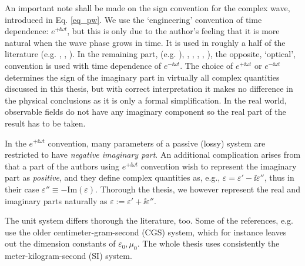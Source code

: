 An important note shall be made on the sign convention for the complex wave, introduced in Eq. \ref{eq_pw}.
We use the `engineering' convention of time dependence: $e^{+\ii \omega t}$, but this is only due to the author's feeling that it is more natural when the wave phase grows in time. 
It is used in  roughly a half of the literature (e.g. \cite[p. 9]{engheta2006book}, \cite[pp. 21, 99]{krowne2007book}, \cite[(Chapters 1-4, 6, 9, 10)]{eleftheriades2005book}).  In the remaining part, (e.g. \cite[(Chapters 5, 7, 8)]{eleftheriades2005book}), \cite{klingshirn2007semiconductor}, \cite{jackson1962book}, \cite{veselago1968}, \cite{born1999book}, \cite[p. 5]{noginov2011book}), the opposite, `optical', convention is used with time dependence of $e^{-\ii \omega t}$. The choice of $e^{+\ii\omega t}$ or $e^{-\ii\omega t}$ determines the sign of the imaginary part in virtually all complex quantities discussed in this thesis, but with correct interpretation it makes no difference in the physical conclusions as it is only a formal simplification.
In the real world, observable fields do not have any imaginary component so the real part of the result has to be taken. 

In the $e^{+\ii\omega t}$ convention, many parameters of a passive (lossy) system are restricted to have \textit{negative imaginary part}.  An additional complication arises from that a part of the authors using $e^{+\ii\omega t}$ convention wish to represent the imaginary part as \textit{positive}, and they define complex quantities as, e.g., $\varepsilon = \varepsilon' - \ii \varepsilon''$, %
thus in their case $\varepsilon''\equiv -\text{Im}(\varepsilon)$. Thorough the thesis, we however represent the real and imaginary parts naturally as $\varepsilon := \varepsilon' + \ii \varepsilon''$.

The unit system differs thorough the literature, too. Some of the references, e.g. \cite{landau1984electrodynamics, agranovich2006spatial, krowne2007book_agran} use the older centimeter-gram-second (CGS) system, which for instance leaves out the dimension constants of $\varepsilon_0, \mu_0$. The whole thesis uses consistently the meter-kilogram-second (SI) system.
